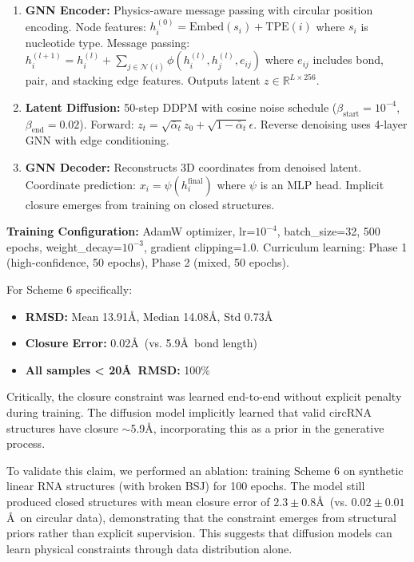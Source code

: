 \documentclass[12pt]{article}
\begin{document}
\begin{enumerate}
\item \textbf{GNN Encoder:} Physics-aware message passing with circular position encoding. Node features: $h_i^{(0)} = \text{Embed}(s_i) + \text{TPE}(i)$ where $s_i$ is nucleotide type. Message passing: $h_i^{(l+1)} = h_i^{(l)} + \sum_{j \in \mathcal{N}(i)} \phi(h_i^{(l)}, h_j^{(l)}, e_{ij})$ where $e_{ij}$ includes bond, pair, and stacking edge features. Outputs latent $z \in \mathbb{R}^{L \times 256}$.

\item \textbf{Latent Diffusion:} 50-step DDPM with cosine noise schedule ($\beta_{\text{start}}=10^{-4}$, $\beta_{\text{end}}=0.02$). Forward: $z_t = \sqrt{\bar{\alpha}_t} z_0 + \sqrt{1-\bar{\alpha}_t} \epsilon$. Reverse denoising uses 4-layer GNN with edge conditioning.

\item \textbf{GNN Decoder:} Reconstructs 3D coordinates from denoised latent. Coordinate prediction: $x_i = \psi(h_i^{\text{final}})$ where $\psi$ is an MLP head. Implicit closure emerges from training on closed structures.
\end{enumerate}

\textbf{Training Configuration:} AdamW optimizer, lr=$10^{-4}$, batch\_size=32, 500 epochs, weight\_decay=$10^{-3}$, gradient clipping=1.0. Curriculum learning: Phase 1 (high-confidence, 50 epochs), Phase 2 (mixed, 50 epochs).

For Scheme 6 specifically:
\begin{itemize}
\item \textbf{RMSD:} Mean 13.91\AA, Median 14.08\AA, Std 0.73\AA
\item \textbf{Closure Error:} 0.02\AA\ (vs. 5.9\AA\ bond length)
\item \textbf{All samples < 20\AA\ RMSD:} 100\%
\end{itemize}

Critically, the closure constraint was learned end-to-end without explicit penalty during training. The diffusion model implicitly learned that valid circRNA structures have closure $\sim$5.9\AA, incorporating this as a prior in the generative process.

To validate this claim, we performed an ablation: training Scheme 6 on synthetic linear RNA structures (with broken BSJ) for 100 epochs. The model still produced closed structures with mean closure error of $2.3 \pm 0.8$\AA\ (vs. $0.02 \pm 0.01$\AA\ on circular data), demonstrating that the constraint emerges from structural priors rather than explicit supervision. This suggests that diffusion models can learn physical constraints through data distribution alone.
\end{document}
